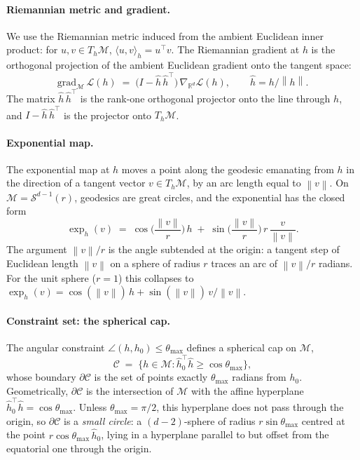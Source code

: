 \documentclass[11pt]{article}
\newcommand{\R}{\mathbb{R}}
\newcommand{\hh}{\hat h}
\newcommand{\thmax}{\theta_{\max}}
\newcommand{\norm}[1]{\left\lVert#1\right\rVert}
\newcommand{\inner}[2]{\langle #1, #2 \rangle}
\begin{document}
\paragraph{Riemannian metric and gradient.} We use the Riemannian metric induced from the ambient Euclidean inner product: for $u, v \in T_h \mathcal{M}$, $\inner{u}{v}_h = u^\top v$. The Riemannian gradient at $h$ is the orthogonal projection of the ambient Euclidean gradient onto the tangent space:
\begin{equation}
\mathrm{grad}_{\mathcal{M}}\,\mathcal{L}(h) \;=\; \big(I - \hh\,\hh^\top\big)\,\nabla_{\R^d}\mathcal{L}(h), \qquad \hh = h/\norm{h}.
\end{equation}
The matrix $\hh\,\hh^\top$ is the rank-one orthogonal projector onto the line through $h$, and $I - \hh\,\hh^\top$ is the projector onto $T_h \mathcal{M}$.

\paragraph{Exponential map.} The exponential map at $h$ moves a point along the geodesic emanating from $h$ in the direction of a tangent vector $v \in T_h\mathcal{M}$, by an arc length equal to $\norm{v}$. On $\mathcal{M} = \mathcal{S}^{d-1}(r)$, geodesics are great circles, and the exponential has the closed form
\begin{equation}
\exp_h(v) \;=\; \cos\!\Big(\frac{\norm{v}}{r}\Big)\,h \;+\; \sin\!\Big(\frac{\norm{v}}{r}\Big)\,r\,\frac{v}{\norm{v}}.
\end{equation}
The argument $\norm{v}/r$ is the angle subtended at the origin: a tangent step of Euclidean length $\norm{v}$ on a sphere of radius $r$ traces an arc of $\norm{v}/r$ radians. For the unit sphere ($r = 1$) this collapses to $\exp_h(v) = \cos(\norm{v})\,h + \sin(\norm{v})\,v/\norm{v}$.

\paragraph{Constraint set: the spherical cap.} The angular constraint $\angle(h, h_0) \le \thmax$ defines a spherical cap on $\mathcal{M}$,
\begin{equation*}
\mathcal{C} \;=\; \{ h \in \mathcal{M} : \hh_0^\top \hh \ge \cos\thmax \},
\end{equation*}
whose boundary $\partial\mathcal{C}$ is the set of points exactly $\thmax$ radians from $h_0$. Geometrically, $\partial\mathcal{C}$ is the intersection of $\mathcal{M}$ with the affine hyperplane $\hh_0^\top \hh = \cos\thmax$. Unless $\thmax = \pi/2$, this hyperplane does not pass through the origin, so $\partial\mathcal{C}$ is a \emph{small circle}: a $(d-2)$-sphere of radius $r\sin\thmax$ centred at the point $r\cos\thmax\,\hh_0$, lying in a hyperplane parallel to but offset from the equatorial one through the origin.
\end{document}
